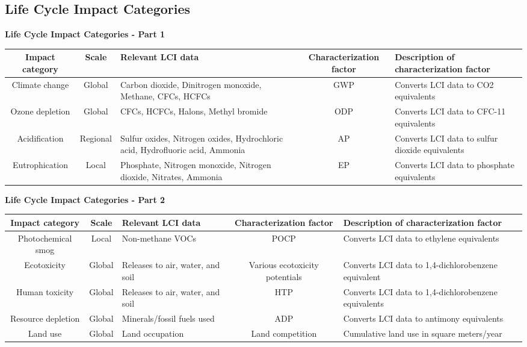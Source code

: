 \documentclass{article}
\begin{document}
\subsection{Life Cycle Impact Categories}

\textbf{Life Cycle Impact Categories - Part 1}\par

\begin{longtable}{|c|c|p{3cm}|c|p{3cm}|}
\hline 
\textbf{Impact category} & \textbf{Scale} & \textbf{Relevant LCI data} & \textbf{Characterization factor} & \textbf{Description of characterization factor} \\
\hline 
Climate change & Global & Carbon dioxide, Dinitrogen monoxide, Methane, CFCs, HCFCs & GWP & Converts LCI data to CO2 equivalents \\
\hline 
Ozone depletion & Global & CFCs, HCFCs, Halons, Methyl bromide & ODP & Converts LCI data to CFC-11 equivalents \\
\hline 
Acidification & Regional & Sulfur oxides, Nitrogen oxides, Hydrochloric acid, Hydrofluoric acid, Ammonia & AP & Converts LCI data to sulfur dioxide equivalents \\
\hline 
Eutrophication & Local & Phosphate, Nitrogen monoxide, Nitrogen dioxide, Nitrates, Ammonia & EP & Converts LCI data to phosphate equivalents \\
\hline 
\end{longtable}

\textbf{Life Cycle Impact Categories - Part 2}\par

\begin{longtable}{|c|c|p{3cm}|c|p{3cm}|}
\hline 
\textbf{Impact category} & \textbf{Scale} & \textbf{Relevant LCI data} & \textbf{Characterization factor} & \textbf{Description of characterization factor} \\
\hline 
Photochemical smog & Local & Non-methane VOCs & POCP & Converts LCI data to ethylene equivalents \\
\hline 
Ecotoxicity & Global & Releases to air, water, and soil & Various ecotoxicity potentials & Converts LCI data to 1,4-dichlorobenzene equivalent \\
\hline 
Human toxicity & Global & Releases to air, water, and soil & HTP & Converts LCI data to 1,4-dichlorobenzene equivalents \\
\hline 
Resource depletion & Global & Minerals/fossil fuels used & ADP & Converts LCI data to antimony equivalents \\
\hline 
Land use & Global & Land occupation & Land competition & Cumulative land use in square meters/year \\
\hline 
\end{longtable}
\end{document}
